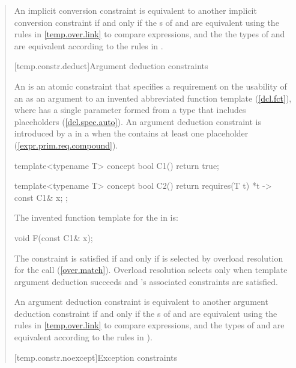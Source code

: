 \begin{quote}
\pnum
An implicit conversion constraint  is equivalent to another implicit 
conversion constraint  if and only if the s 
of  and  are equivalent using the rules in
\ref{temp.over.link} to compare expressions, and the the types
of  and  are equivalent according to the rules in
.


[temp.constr.deduct]{Argument deduction constraints}

\pnum
An  is an atomic
constraint that specifies a requirement on 
the usability of an  
 as an argument to an invented abbreviated
function template  (\ref{dcl.fct}),
where  has a single parameter formed from a type that 
includes placeholders (\ref{dcl.spec.auto}).
% 
\enternote
An argument deduction constraint is introduced by a
 in a
 when the
contains at least one placeholder
(\ref{expr.prim.req.compound}).
\exitnote
% 
\enterexample
\begin{codeblock}
template<typename T>
concept bool C1() { return true; }

template<typename T>
concept bool C2() { return requires(T t) { {*t} -> const C1& x; }; }
\end{codeblock}
The invented function template for the
 in
 is:
\begin{codeblock}
void F(const C1& x);
\end{codeblock}
\exitexample
% 
The constraint is satisfied if and only if 
is selected by overload resolution for the call 
(\ref{over.match}).
% 
\enternote
Overload resolution selects  only when template 
argument deduction succeeds and 's associated 
constraints are satisfied.
\exitnote

\pnum
An argument deduction constraint  is equivalent to another 
argument deduction constraint  if and only if the 
s of  and  are equivalent
using the rules in \ref{temp.over.link} to compare expressions, and the types
of  and  are equivalent according to the rules in 
).


[temp.constr.noexcept]{Exception constraints}


\end{quote}

